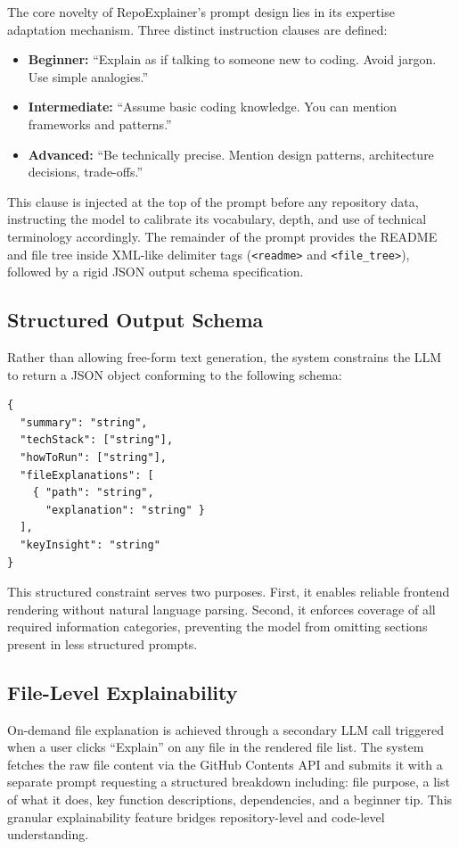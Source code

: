 \documentclass[conference]{IEEEtran}
\begin{document}
The core novelty of RepoExplainer's prompt design lies in its expertise adaptation mechanism. Three distinct instruction clauses are defined:

\begin{itemize}
    \item \textbf{Beginner:} ``Explain as if talking to someone new to coding. Avoid jargon. Use simple analogies.''
    \item \textbf{Intermediate:} ``Assume basic coding knowledge. You can mention frameworks and patterns.''
    \item \textbf{Advanced:} ``Be technically precise. Mention design patterns, architecture decisions, trade-offs.''
\end{itemize}

This clause is injected at the top of the prompt before any repository data, instructing the model to calibrate its vocabulary, depth, and use of technical terminology accordingly. The remainder of the prompt provides the README and file tree inside XML-like delimiter tags (\texttt{<readme>} and \texttt{<file\_tree>}), followed by a rigid JSON output schema specification.

\subsection{Structured Output Schema}

Rather than allowing free-form text generation, the system constrains the LLM to return a JSON object conforming to the following schema:

\begin{verbatim}
{
  "summary": "string",
  "techStack": ["string"],
  "howToRun": ["string"],
  "fileExplanations": [
    { "path": "string",
      "explanation": "string" }
  ],
  "keyInsight": "string"
}
\end{verbatim}

This structured constraint serves two purposes. First, it enables reliable frontend rendering without natural language parsing. Second, it enforces coverage of all required information categories, preventing the model from omitting sections present in less structured prompts.

\subsection{File-Level Explainability}

On-demand file explanation is achieved through a secondary LLM call triggered when a user clicks ``Explain'' on any file in the rendered file list. The system fetches the raw file content via the GitHub Contents API and submits it with a separate prompt requesting a structured breakdown including: file purpose, a list of what it does, key function descriptions, dependencies, and a beginner tip. This granular explainability feature bridges repository-level and code-level understanding.
\end{document}

